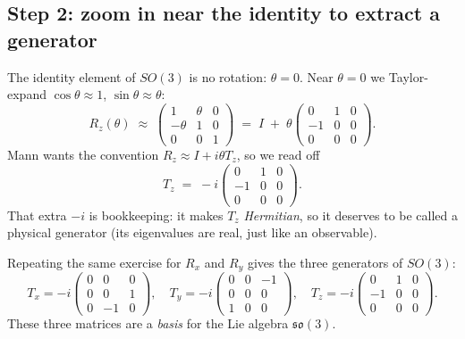 \documentclass[11pt]{article}
\begin{document}
\subsection*{Step 2: zoom in near the identity to extract a generator}

The identity element of $SO(3)$ is no rotation: $\theta = 0$. Near
$\theta = 0$ we Taylor-expand $\cos\theta \approx 1$, $\sin\theta
\approx \theta$:
\[
  R_z(\theta) \;\approx\; \begin{pmatrix} 1 & \theta & 0 \\
                                          -\theta & 1 & 0 \\
                                          0 & 0 & 1 \end{pmatrix}
  \;=\; I \;+\; \theta \begin{pmatrix} 0 & 1 & 0 \\
                                       -1 & 0 & 0 \\
                                       0 & 0 & 0 \end{pmatrix}.
\]
Mann wants the convention $R_z \approx I + i \theta T_z$, so we read off
\begin{equation}
  T_z \;=\; -i \begin{pmatrix} 0 & 1 & 0 \\
                               -1 & 0 & 0 \\
                               0 & 0 & 0 \end{pmatrix}.
\end{equation}
That extra $-i$ is bookkeeping: it makes $T_z$ \emph{Hermitian}, so it
deserves to be called a physical generator (its eigenvalues are real,
just like an observable).

Repeating the same exercise for $R_x$ and $R_y$ gives the three
generators of $SO(3)$:
\[
  T_x = -i\begin{pmatrix} 0 & 0 & 0 \\ 0 & 0 & 1 \\
                          0 & -1 & 0 \end{pmatrix},
  \quad
  T_y = -i\begin{pmatrix} 0 & 0 & -1 \\ 0 & 0 & 0 \\
                          1 & 0 & 0 \end{pmatrix},
  \quad
  T_z = -i\begin{pmatrix} 0 & 1 & 0 \\ -1 & 0 & 0 \\
                          0 & 0 & 0 \end{pmatrix}.
\]
These three matrices are a \emph{basis} for the Lie algebra
$\mathfrak{so}(3)$.
\end{document}
